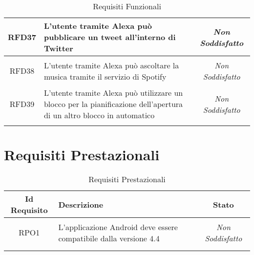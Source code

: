 \begin{longtable}{|c|>{\centering}m{7cm}|c|}
	\hypertarget{RFD37}{RFD37} & L'utente tramite Alexa può pubblicare un tweet all'interno di Twitter & {\textit{Non Soddisfatto}}\\ \hline
	
	\hypertarget{RFD38}{RFD38} & L'utente tramite Alexa può ascoltare la musica tramite il servizio di Spotify & {\textit{Non Soddisfatto}}\\ \hline
	
	\hypertarget{RFD39}{RFD39} & L'utente tramite Alexa può utilizzare un blocco per la pianificazione dell'apertura di un altro blocco in automatico & {\textit{Non Soddisfatto}}\\ \hline
	
	\caption[Requisiti Funzionali]{Requisiti Funzionali}
	\label{tabella:req0}
\end{longtable}
\clearpage
\section{Requisiti Prestazionali}
\normalsize
\begin{longtable}{|c|>{\centering}m{7cm}|c|}
	\hline
	\textbf{Id Requisito} & \textbf{Descrizione} & \textbf{Stato}\\
	\hline
	\endhead
	\hypertarget{RPO1}{RPO1} & L'applicazione Android deve essere compatibile dalla versione 4.4 & {\textit{Non Soddisfatto}}\\ \hline
	
	\caption[Requisiti Prestazionali]{Requisiti Prestazionali}
	\label{tabella:req1}
\end{longtable}
\clearpage
